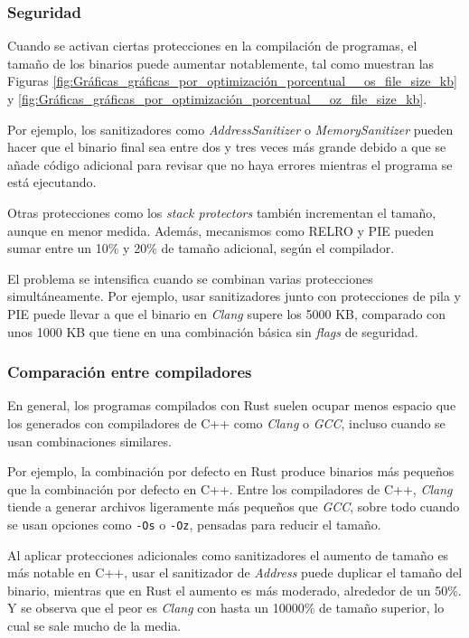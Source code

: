 \subsubsection{\texorpdfstring{\textbf{Seguridad}}{Seguridad}}

Cuando se activan ciertas protecciones en la compilación de programas,
el tamaño de los binarios puede aumentar notablemente, tal como muestran
las Figuras \ref{fig:Gráficas_gráficas_por_optimización_porcentual__os_file_size_kb} y
\ref{fig:Gráficas_gráficas_por_optimización_porcentual__oz_file_size_kb}.

Por ejemplo, los sanitizadores como \emph{AddressSanitizer} o \emph{MemorySanitizer}
pueden hacer que el binario final sea entre dos y tres veces más grande
debido a que se añade código adicional para revisar que no haya errores
mientras el programa se está ejecutando.

Otras protecciones como los \emph{stack protectors} también incrementan
el tamaño, aunque en menor medida. Además, mecanismos como RELRO
y {PIE} pueden sumar entre un 10\% y 20\% de tamaño adicional,
según el compilador.

El problema se intensifica cuando se combinan varias protecciones
simultáneamente. Por ejemplo, usar sanitizadores junto con protecciones
de pila y PIE puede llevar a que el binario en \emph{Clang}
supere los 5000 KB, comparado con unos 1000 KB que tiene en una
combinación básica sin \emph{flags} de seguridad.

\subsubsection{\texorpdfstring{\textbf{Comparación entre
compiladores}}{Comparación entre Compiladores}}

En general, los programas compilados con Rust suelen ocupar menos
espacio que los generados con compiladores de C++ como \emph{Clang} o
\emph{GCC}, incluso cuando se usan combinaciones similares.

Por ejemplo, la combinación por defecto en Rust produce binarios más
pequeños que la combinación por defecto en C++. Entre los compiladores
de C++, \emph{Clang} tiende a generar archivos ligeramente más
pequeños que \emph{GCC}, sobre todo cuando se usan opciones como
\texttt{-Os} o \texttt{-Oz}, pensadas para reducir el tamaño.

Al aplicar protecciones adicionales como sanitizadores el aumento de
tamaño es más notable en C++, usar el sanitizador de \emph{Address}
puede duplicar el tamaño del binario, mientras que en Rust el aumento es
más moderado, alrededor de un 50\%. Y se observa que el peor es \emph{Clang}
con hasta un 10000\% de tamaño superior, lo cual se sale mucho de la media.

